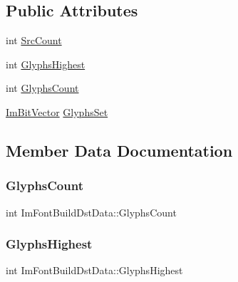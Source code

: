 \subsection*{Public Attributes}
\begin{DoxyCompactItemize}
\item 
int \hyperlink{structImFontBuildDstData_ab13d637daba34891db2968684647a728}{Src\+Count}
\item 
int \hyperlink{structImFontBuildDstData_a2c0592f57b8381a9d106b6881491b29c}{Glyphs\+Highest}
\item 
int \hyperlink{structImFontBuildDstData_aeb9950177ed2ec156332ec8c3683c2e2}{Glyphs\+Count}
\item 
\hyperlink{structImBitVector}{Im\+Bit\+Vector} \hyperlink{structImFontBuildDstData_acb81b9abe454d0a989ae467a5b208d9a}{Glyphs\+Set}
\end{DoxyCompactItemize}


\subsection{Member Data Documentation}
\mbox{\label{structImFontBuildDstData_aeb9950177ed2ec156332ec8c3683c2e2}} 
\subsubsection{\texorpdfstring{Glyphs\+Count}{GlyphsCount}}
{\footnotesize\ttfamily int Im\+Font\+Build\+Dst\+Data\+::\+Glyphs\+Count}

\mbox{\label{structImFontBuildDstData_a2c0592f57b8381a9d106b6881491b29c}} 
\subsubsection{\texorpdfstring{Glyphs\+Highest}{GlyphsHighest}}
{\footnotesize\ttfamily int Im\+Font\+Build\+Dst\+Data\+::\+Glyphs\+Highest}

\mbox{\label{structImFontBuildDstData_acb81b9abe454d0a989ae467a5b208d9a}} 
